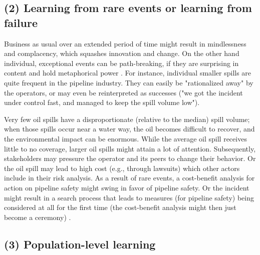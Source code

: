 \documentclass[12pt, man, natbib]{apa6}
\begin{document}
	\subsection{(2) Learning from rare events or learning from failure}
	
	Business as usual over an extended period of time might result in mindlessness and complacency, which squashes innovation and change. On the other hand individual, exceptional events can be path-breaking, if they are surprising in content and hold metaphorical power \citep{March1991}. For instance, individual smaller spills are quite frequent in the pipeline industry. They can easily be "rationalized away" by the operators, or may even be reinterpreted as successes ("we got the incident under control fast, and managed to keep the spill volume low").
	
	Very few oil spills have a disproportionate (relative to the median) spill volume; when those spills occur near a water way, the oil becomes difficult to recover, and the environmental impact can be enormous. While the average oil spill receives little to no coverage, larger oil spills might attain a lot of attention. Subsequently, stakeholders may pressure the operator and its peers to change their behavior. Or the oil spill may lead to high cost (e.g., through lawsuits) which other actors include in their risk analysis.  As a result of rare events, a cost-benefit analysis for action on pipeline safety might swing in favor of pipeline safety. Or the incident might result in a search process that leads to measures (for pipeline safety) being considered at all for the first time (the cost-benefit analysis might then just become a ceremony) \citep{Madsen2010}.
	
	\subsection{(3) Population-level learning}
\end{document}
